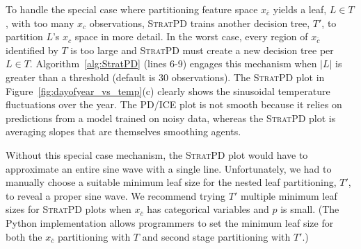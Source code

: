 \documentclass[12pt]{article}
\newcommand{\figref}[1]{Figure~\ref{#1}}
\newcommand{\algref}[1]{Algorithm~\ref{#1}}
\newcommand{\spd}{\fontfamily{cmr}\textsc{\small StratPD}}
\newcommand{\xnc}{$x_{\overline{c}}$}
\begin{document}
To handle the special case where partitioning feature space \xnc{} yields a leaf, $L \in T$, with too many $x_c$ observations, \spd{} trains another decision tree, $T'$, to partition $L$'s $x_c$ space in more detail. In the worst case, every region of \xnc{} identified by $T$ is too large and \spd{} must create a new decision tree per $L \in T$. \algref{alg:StratPD} (lines 6-9) engages this mechanism when $|L|$ is greater than a threshold (default is 30 observations). The \spd{} plot in \figref{fig:dayofyear_vs_temp}(c) clearly shows the sinusoidal temperature fluctuations over the year. The PD/ICE plot is not smooth because it relies on predictions from a model trained on noisy data, whereas the \spd{} plot is averaging slopes that are themselves smoothing agents.

Without this special case mechanism, the \spd{} plot would have to approximate an entire sine wave with a single line.  Unfortunately, we had to manually choose a suitable minimum leaf size for the nested leaf partitioning, $T'$, to reveal a proper sine wave.  We recommend trying $T'$ multiple minimum leaf sizes for \spd{} plots when \xnc{} has categorical variables and $p$ is small. (The Python implementation allows programmers to set the minimum leaf size for both the \xnc{} partitioning with $T$ and second stage partitioning with $T'$.)
\end{document}
